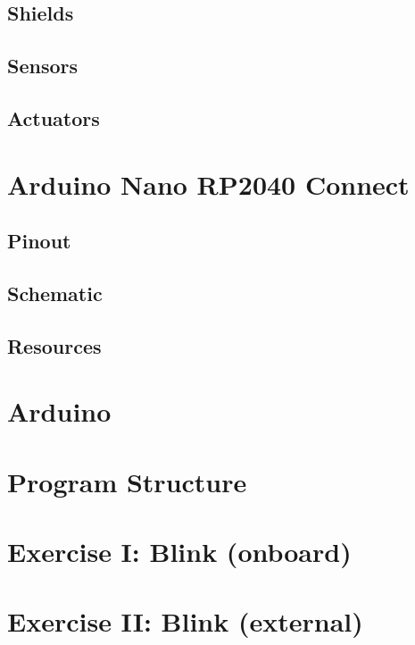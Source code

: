 \documentclass[aspectratio=169]{beamer}
\begin{document}
\subsection{Shields}

\subsection{Sensors}

\subsection{Actuators}


\section{Arduino\textregistered{} Nano RP2040 Connect}


\subsection{Pinout}

\subsection{Schematic}

\subsection{Resources}


\section{Arduino\textregistered{} }


\section{Program Structure}


\section{Exercise I: Blink  (onboard)}


\section{Exercise II: Blink  (external)}

\end{document}
